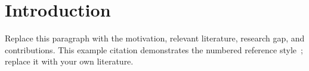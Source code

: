 \section{Introduction}\label{sec:introduction}
Replace this paragraph with the motivation, relevant literature, research
gap, and contributions. This example citation demonstrates the numbered
reference style~\cite{elsevierLatex}; replace it with your own literature.
